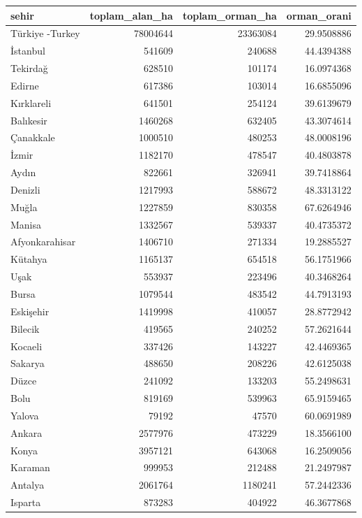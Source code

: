 \documentclass[
  11pt,
  a4paper,
  DIV=11,
  numbers=noendperiod]{scrartcl}
\newcounter{none} %
\begin{document}
{\def\LTcaptype{none} %
\begin{longtable}[]{@{}lrrr@{}}
\toprule\noalign{}
sehir & toplam\_alan\_ha & toplam\_orman\_ha & orman\_orani \\
\midrule\noalign{}
\endhead
\bottomrule\noalign{}
\endlastfoot
Türkiye -Turkey & 78004644 & 23363084 & 29.9508886 \\
İstanbul & 541609 & 240688 & 44.4394388 \\
Tekirdağ & 628510 & 101174 & 16.0974368 \\
Edirne & 617386 & 103014 & 16.6855096 \\
Kırklareli & 641501 & 254124 & 39.6139679 \\
Balıkesir & 1460268 & 632405 & 43.3074614 \\
Çanakkale & 1000510 & 480253 & 48.0008196 \\
İzmir & 1182170 & 478547 & 40.4803878 \\
Aydın & 822661 & 326941 & 39.7418864 \\
Denizli & 1217993 & 588672 & 48.3313122 \\
Muğla & 1227859 & 830358 & 67.6264946 \\
Manisa & 1332567 & 539337 & 40.4735372 \\
Afyonkarahisar & 1406710 & 271334 & 19.2885527 \\
Kütahya & 1165137 & 654518 & 56.1751966 \\
Uşak & 553937 & 223496 & 40.3468264 \\
Bursa & 1079544 & 483542 & 44.7913193 \\
Eskişehir & 1419998 & 410057 & 28.8772942 \\
Bilecik & 419565 & 240252 & 57.2621644 \\
Kocaeli & 337426 & 143227 & 42.4469365 \\
Sakarya & 488650 & 208226 & 42.6125038 \\
Düzce & 241092 & 133203 & 55.2498631 \\
Bolu & 819169 & 539963 & 65.9159465 \\
Yalova & 79192 & 47570 & 60.0691989 \\
Ankara & 2577976 & 473229 & 18.3566100 \\
Konya & 3957121 & 643068 & 16.2509056 \\
Karaman & 999953 & 212488 & 21.2497987 \\
Antalya & 2061764 & 1180241 & 57.2442336 \\
Isparta & 873283 & 404922 & 46.3677868 \\

\end{longtable}}
\end{document}
